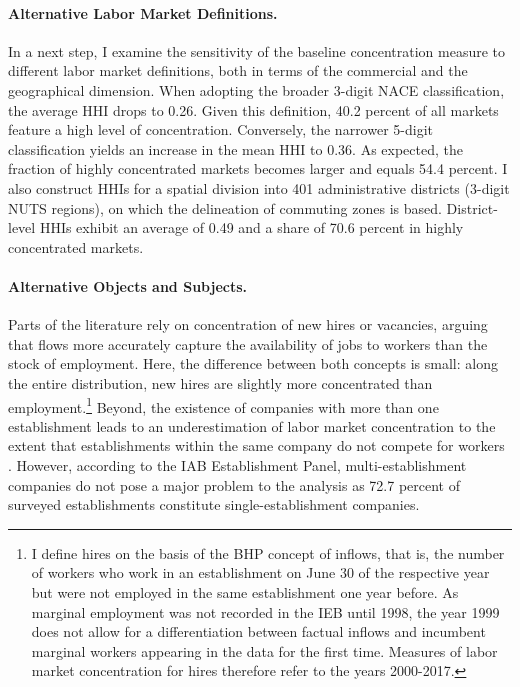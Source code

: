 \documentclass[11pt,oneside,reqno,xcolor=dvipsnames]{article} %
\begin{document}
\paragraph{Alternative Labor Market Definitions.} In a next step, I examine the sensitivity of the baseline concentration measure to different labor market definitions, both in terms of the commercial and the geographical dimension. When adopting the broader 3-digit NACE classification, the average HHI drops to 0.26. Given this definition, 40.2 percent of all markets feature a high level of concentration. Conversely, the narrower 5-digit classification yields an increase in the mean HHI to 0.36. As expected, the fraction of highly concentrated markets becomes larger and equals 54.4 percent. I also construct HHIs for a spatial division into 401 administrative districts (3-digit NUTS regions), on which the delineation of commuting zones is based. District-level HHIs exhibit an average of 0.49 and a share of 70.6 percent in highly concentrated markets.



\paragraph{Alternative Objects and Subjects.} Parts of the literature rely on concentration of new hires or vacancies, arguing that flows more accurately capture the availability of jobs to workers than the stock of employment. Here, the difference between both concepts is small: along the entire distribution, new hires are slightly more concentrated than employment.\footnote{I define hires on the basis of the BHP concept of inflows, that is, the number of workers who work in an establishment on June 30 of the respective year but were not employed in the same establishment one year before. As marginal employment was not recorded in the IEB until 1998, the year 1999 does not allow for a differentiation between factual inflows and incumbent marginal workers appearing in the data for the first time. Measures of labor market concentration for hires therefore refer to the years 2000-2017.} Beyond, the existence of companies with more than one establishment leads to an underestimation of labor market concentration to the extent that establishments within the same company do not compete for workers \citep{MarinescuEtAl2021}. However, according to the IAB Establishment Panel, multi-establishment companies do not pose a major problem to the analysis as 72.7 percent of surveyed establishments constitute single-establishment companies.
\end{document}
